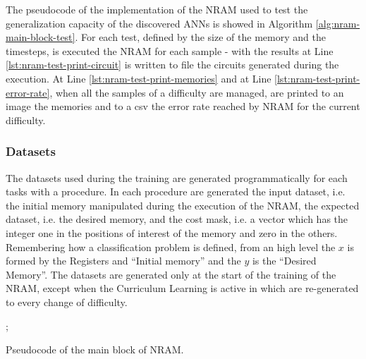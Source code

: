 The pseudocode of the implementation of the NRAM used to test the generalization capacity of the discovered ANNs is showed in Algorithm \ref{alg:nram-main-block-test}. For each test, defined by the size of the memory and the timesteps, is executed the NRAM for each sample - with the results at Line \ref{lst:nram-test-print-circuit} is written to file the circuits generated during the execution. At Line \ref{lst:nram-test-print-memories} and at Line \ref{lst:nram-test-print-error-rate}, when all the samples of a difficulty are managed, are printed to an image the memories and to a csv the error rate reached by NRAM for the current difficulty. 


\subsubsection{Datasets}\label{subsubsec:nram-dataset}
The datasets used during the training are generated programmatically for each tasks with a procedure. In each procedure are generated the input dataset, i.e. the initial memory manipulated during the execution of the NRAM, the expected dataset, i.e. the desired memory, and the cost mask, i.e. a vector which has the integer one in the positions of interest of the memory and zero in the others. Remembering how a classification problem is defined, from an high level the $x$ is formed by the Registers and ``Initial memory'' and the $y$ is the ``Desired Memory''. The datasets are generated only at the start of the training of the NRAM, except when the Curriculum Learning is active in which are re-generated to every change of difficulty.

\begin{algorithm}
	\begin{algorithmic}[1]
            	;
			\label{lst:nram-timesteps}
				\label{lst:nram-nn-predict}
				\label{lst:nram-run-circuit}
				\State{}
				\label{lst:nram-cost-1}
				\Else
				\EndIf
				\State{}
				\State{}
				\State{}
                	\label{lst:nram-cost-2}
			\EndFor{}
			\State{}
		\EndFunction
	\end{algorithmic}
	\caption{Pseudocode of the main block of NRAM.}\label{alg:nram-main-block}
\end{algorithm}

